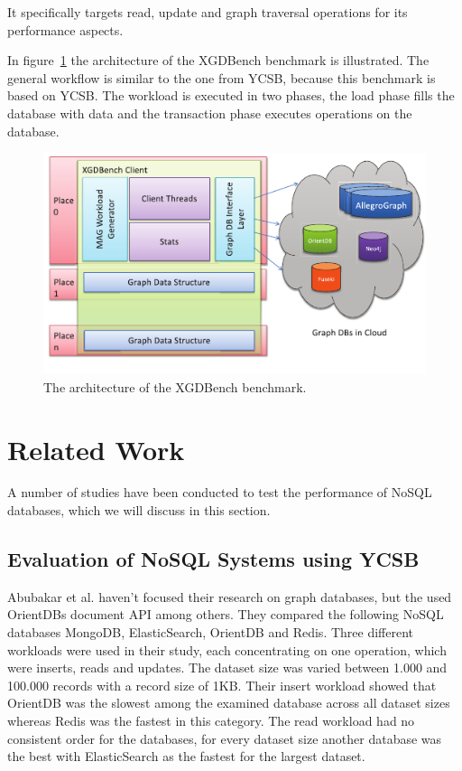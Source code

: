 It specifically targets read,
update and graph traversal operations for its performance aspects.~\cite[366]{Dayarathna2012}

In figure~\ref{fig:XGDBenchArchitecture} the architecture of the XGDBench benchmark is illustrated.
The general workflow is similar to the one from YCSB,
because this benchmark is based on YCSB.
The workload is executed in two phases,
the load phase fills the database with data and the transaction phase executes operations on the database.

\begin{figure}[h!]
  \centering
  \includegraphics[width=.75\textwidth]{images/benchmarks/XGDBenchArchitecture}
  \caption{The architecture of the XGDBench benchmark.~\cite[367]{Dayarathna2012}}
  \label{fig:XGDBenchArchitecture}
\end{figure}

\section{Related Work}
A number of studies have been conducted to test the performance of NoSQL databases,
which we will discuss in this section.

\subsection{Evaluation of NoSQL Systems using YCSB}
Abubakar et al. haven't focused their research on graph databases,
but the used OrientDBs document API among others.
They compared the following NoSQL databases MongoDB, ElasticSearch, OrientDB and Redis.
Three different workloads were used in their study,
each concentrating on one operation,
which were inserts, reads and updates.
The dataset size was varied between 1.000 and 100.000 records with a record size of 1KB.
Their insert workload showed that OrientDB was the slowest among the examined database across all dataset sizes whereas Redis was the fastest in this category.
The read workload had no consistent order for the databases,
for every dataset size another database was the best with ElasticSearch as the fastest for the largest dataset.~\cite{Abubakar2014}

